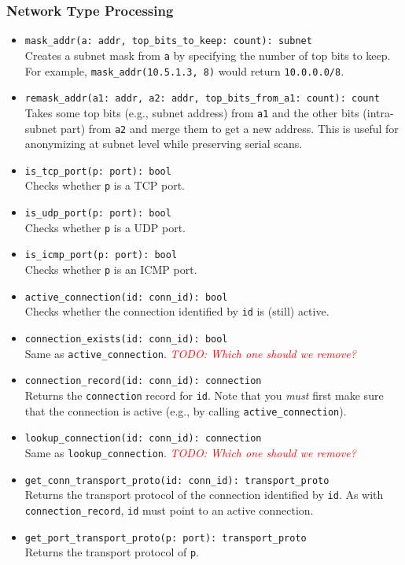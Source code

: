 \documentclass[10pt,landscape]{article}
\def\todo#1{\textit{\textcolor{red}{TODO: #1}}}
\begin{document}
\begin{multicols*}{2}
\subsubsection*{Network Type Processing}

\begin{itemize}
  \item \verb|mask_addr(a: addr, top_bits_to_keep: count): subnet|\\
    Creates a subnet mask from \texttt{a} by specifying the number of top bits
    to keep. For example, \verb|mask_addr(10.5.1.3, 8)| would return
    \verb|10.0.0.0/8|.
  \item \verb|remask_addr(a1: addr, a2: addr, top_bits_from_a1: count): count|\\
    Takes some top bits (e.g., subnet address) from \texttt{a1} and the other
    bits (intra-subnet part) from \texttt{a2} and merge them to get a new
    address. This is useful for anonymizing at subnet level while preserving
    serial scans.
  \item \verb|is_tcp_port(p: port): bool|\\
    Checks whether \texttt{p} is a TCP port.
  \item \verb|is_udp_port(p: port): bool|\\
    Checks whether \texttt{p} is a UDP port.
  \item \verb|is_icmp_port(p: port): bool|\\
    Checks whether \texttt{p} is an ICMP port.
  \item \verb|active_connection(id: conn_id): bool|\\
    Checks whether the connection identified by \texttt{id} is (still) active.
  \item \verb|connection_exists(id: conn_id): bool|\\
    Same as \verb|active_connection|. \todo{Which one should we remove?}
  \item \verb|connection_record(id: conn_id): connection|\\
    Returns the \texttt{connection} record for \texttt{id}.
    Note that you \emph{must} first make sure that the connection is active
    (e.g., by calling \verb|active_connection|).
  \item \verb|lookup_connection(id: conn_id): connection|\\
    Same as \verb|lookup_connection|. \todo{Which one should we remove?}
  \item \verb|get_conn_transport_proto(id: conn_id): transport_proto|\\
    Returns the transport protocol of the connection identified by \texttt{id}.
    As with \verb|connection_record|, \texttt{id} must point to an active
    connection.
  \item \verb|get_port_transport_proto(p: port): transport_proto|\\
    Returns the transport protocol of \texttt{p}.
\end{itemize}


\end{multicols*}
\end{document}
